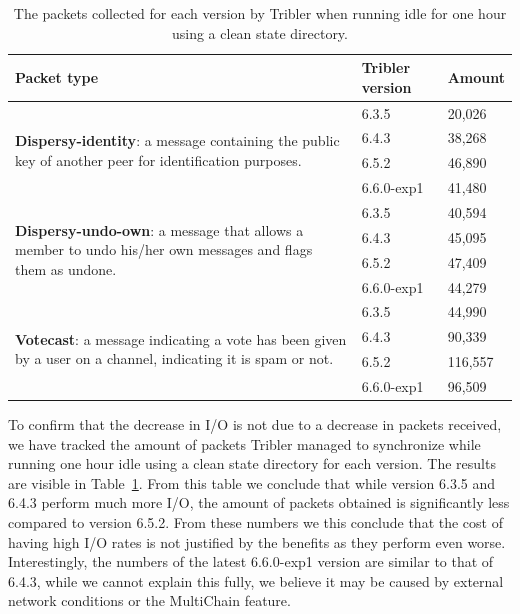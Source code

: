 \begin{table}[]
	\centering
	\caption{The packets collected for each version by Tribler when running idle for one hour using a clean state directory.}
	\label{table:packets_collected_idle}
	\begin{tabular}{|p{7.2cm}|l|l|}
		\hline
		\textbf{Packet type}                         & \textbf{Tribler version} & \textbf{Amount}  \\ \hline
		\multirow{4}{*}{\begin{minipage}{7.2cm}\textbf{Dispersy-identity}: a message containing the public key of another peer for identification purposes.\end{minipage}} & 6.3.5           & 20,026  \\ \cline{2-3} 
		& 6.4.3           & 38,268  \\ \cline{2-3} 
		& 6.5.2           & 46,890  \\ \cline{2-3} 
		& 6.6.0-exp1      & 41,480  \\ \hline
		\multirow{4}{*}{\begin{minipage}{7.2cm}\textbf{Dispersy-undo-own}: a message that allows a member to undo his/her own messages and flags them as undone.\end{minipage}} & 6.3.5           & 40,594  \\ \cline{2-3} 
		& 6.4.3           & 45,095  \\ \cline{2-3} 
		& 6.5.2           & 47,409  \\ \cline{2-3} 
		& 6.6.0-exp1      & 44,279  \\ \hline
		\multirow{4}{*}{\begin{minipage}{7.2cm}\textbf{Votecast}: a message indicating a vote has been given by a user on a channel, indicating it is spam or not.\end{minipage}}          & 6.3.5           & 44,990  \\ \cline{2-3} 
		& 6.4.3           & 90,339  \\ \cline{2-3} 
		& 6.5.2           & 116,557 \\ \cline{2-3} 
		& 6.6.0-exp1      & 96,509  \\ \hline
	\end{tabular}
\end{table}

To confirm that the decrease in I/O is not due to a decrease in packets received, we have tracked the amount of packets Tribler managed to synchronize while running one hour idle using a clean state directory for each version.
The results are visible in Table~\ref{table:packets_collected_idle}.
From this table we conclude that while version 6.3.5 and 6.4.3 perform much more I/O, the amount of packets obtained is significantly less compared to version 6.5.2.
From these numbers we this conclude that the cost of having high I/O rates is not justified by the benefits as they perform even worse. 
Interestingly, the numbers of the latest 6.6.0-exp1 version are similar to that of 6.4.3, while we cannot explain this fully, we believe it may be caused by external network conditions or the MultiChain feature.

